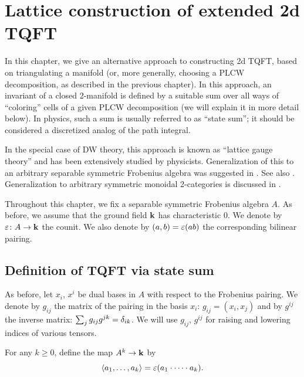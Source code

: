 \chapter{Lattice construction of extended 2d TQFT}\label{c:2d-lattice}

In this chapter, we give an alternative approach to constructing 2d TQFT, based
on triangulating a manifold (or, more generally, choosing a PLCW decomposition,
as described in the previous chapter). In this approach, an invariant of a
closed 2-manifold is defined by a suitable sum over all ways of ``coloring''
cells of a given PLCW decomposition (we will explain it in more detail below).
In physics, such a sum is usually referred to as ``state sum''; it should be
considered a discretized analog of the path integral.

In the special case of DW theory, this approach is known as ``lattice gauge
theory'' and has been extensively studied by physicists. Generalization of
this to an arbitrary separable symmetric Frobenius algebra was suggested in
\cite{fhk}. See also \cite{oeckl}. Generalization to arbitrary symmetric
monoidal 2-categories is discussed in \cite{davidovich}.

Throughout this chapter, we fix a separable symmetric Frobenius algebra
$A$. As before, we assume that the ground field $\mathbf{k}$ has characteristic 0.
We denote by $\varepsilon \colon A\to \mathbf{k}$ the counit. We also denote by
$(a,b)=\varepsilon(ab)$ the corresponding bilinear pairing.

\section{Definition of TQFT via state sum}\label{s:state-sum}
As before, let $x_i$, $x^i$ be dual bases in $A$ with respect to the
Frobenius pairing. We denote by $g_{ij}$ the matrix of the pairing in
the basis $x_i$: $g_{ij}=(x_i,x_j)$ and by $g^{ij}$ the inverse matrix:
$\sum_{j} g_{ij}g^{jk}=\delta_{ik}$. We will use $g_{ij}$, $g^{ij}$ for
raising and lowering indices of various tensors.

For any $k \ge 0$, define the map $A^k\to \mathbf{k}$ by
\begin{equation}\label{e:k-pairing}
\langle a_1, \dots, a_k\rangle = \varepsilon (a_1\cdot \dots \cdot a_k).
\end{equation}

